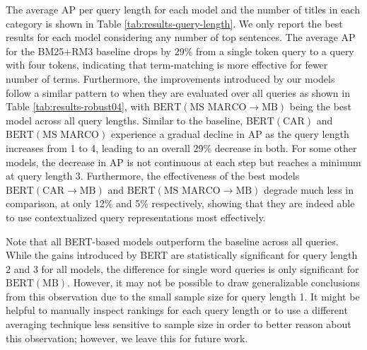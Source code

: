 The average AP per query length for each model and the number of titles in each category is shown in Table \ref{tab:results-query-length}.
We only report the best results for each model considering any number of top sentences.
The average AP for the BM25+RM3 baseline drops by 29\% from a single token query to a query with four tokens, indicating that term-matching is more effective for fewer number of terms.
Furthermore, the improvements introduced by our models follow a similar pattern to when they are evaluated over all queries as shown in Table \ref{tab:results-robust04}, with $ \textrm{BERT}(\textrm{MS MARCO}\rightarrow\textrm{MB}) $ being the best model across all query lengths.
Similar to the baseline, $ \textrm{BERT}(\textrm{CAR}) $ and $ \textrm{BERT}(\textrm{MS MARCO}) $ experience a gradual decline in AP as the query length increases from 1 to 4, leading to an overall 29\% decrease in both.
For some other models, the decrease in AP is not continuous at each step but reaches a minimum at query length 3.
Furthermore, the effectiveness of the best models  $ \textrm{BERT}(\textrm{CAR}\rightarrow\textrm{MB}) $ and $ \textrm{BERT}(\textrm{MS MARCO}\rightarrow\textrm{MB}) $ degrade much less in comparison, at only 12\% and 5\% respectively, showing that they are indeed able to use contextualized query representations most effectively.

Note that all BERT-based models outperform the baseline across all queries.
While the gains introduced by BERT are statistically significant for query length 2 and 3 for all models, the difference for single word queries is only significant for $ \textrm{BERT}(\textrm{MB}) $.
However, it may not be possible to draw generalizable conclusions from this observation due to the small sample size for query length 1.
It might be helpful to manually inspect rankings for each query length or to use a different averaging technique less sensitive to sample size in order to better reason about this observation; however, we leave this for future work.



